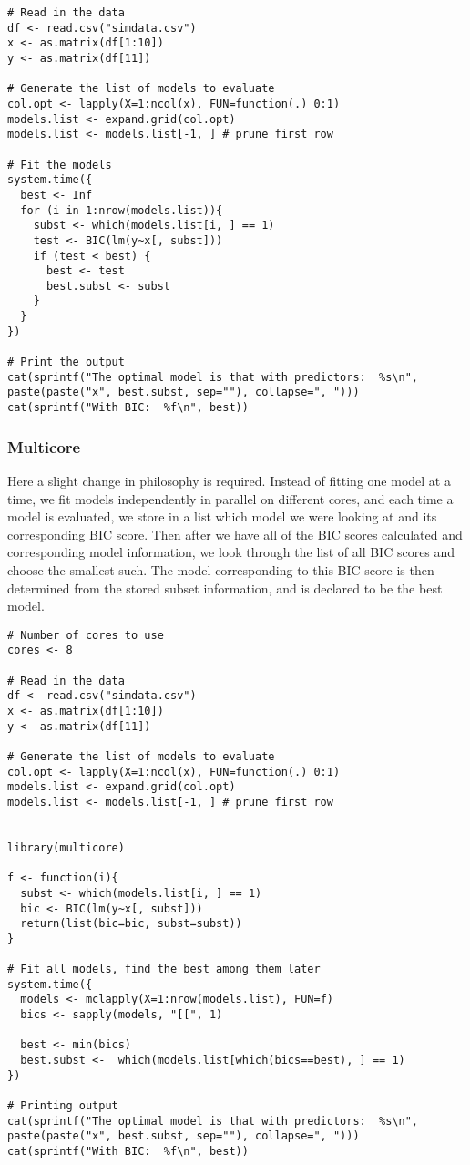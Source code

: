 \begin{lstlisting}[language=rr]
# Read in the data
df <- read.csv("simdata.csv")
x <- as.matrix(df[1:10])
y <- as.matrix(df[11])

# Generate the list of models to evaluate
col.opt <- lapply(X=1:ncol(x), FUN=function(.) 0:1)
models.list <- expand.grid(col.opt)
models.list <- models.list[-1, ] # prune first row

# Fit the models
system.time({
  best <- Inf
  for (i in 1:nrow(models.list)){
    subst <- which(models.list[i, ] == 1)
    test <- BIC(lm(y~x[, subst]))
    if (test < best) {
      best <- test
      best.subst <- subst
    }
  }
})

# Print the output
cat(sprintf("The optimal model is that with predictors:  %s\n", paste(paste("x", best.subst, sep=""), collapse=", ")))
cat(sprintf("With BIC:  %f\n", best))
\end{lstlisting}


\subsubsection{Multicore}\label{mcmodelsel}
Here a slight change in philosophy is required.  Instead of fitting one model at a time, we fit models independently in parallel on different cores, and each time a model is evaluated, we store in a list which model we were looking at and its corresponding BIC score.  Then after we have all of the BIC scores calculated and corresponding model information, we look through the list of all BIC scores and choose the smallest such.  The model corresponding to this BIC score is then determined from the stored subset information, and is declared to be the best model.
\begin{lstlisting}[language=rr]
# Number of cores to use
cores <- 8

# Read in the data
df <- read.csv("simdata.csv")
x <- as.matrix(df[1:10])
y <- as.matrix(df[11])

# Generate the list of models to evaluate
col.opt <- lapply(X=1:ncol(x), FUN=function(.) 0:1)
models.list <- expand.grid(col.opt)
models.list <- models.list[-1, ] # prune first row


library(multicore)

f <- function(i){
  subst <- which(models.list[i, ] == 1)
  bic <- BIC(lm(y~x[, subst]))
  return(list(bic=bic, subst=subst))
}

# Fit all models, find the best among them later
system.time({
  models <- mclapply(X=1:nrow(models.list), FUN=f)
  bics <- sapply(models, "[[", 1)

  best <- min(bics)
  best.subst <-  which(models.list[which(bics==best), ] == 1)
})

# Printing output
cat(sprintf("The optimal model is that with predictors:  %s\n", paste(paste("x", best.subst, sep=""), collapse=", ")))
cat(sprintf("With BIC:  %f\n", best))
\end{lstlisting}


